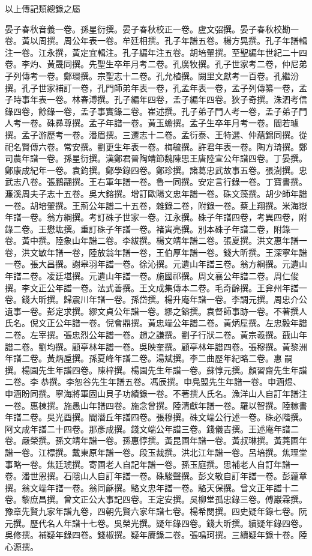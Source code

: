 \begin{pinyinscope}
以上傳記類總錄之屬

晏子春秋音義一卷。孫星衍撰。晏子春秋校正一卷。盧文弨撰。晏子春秋校勘一卷。黃以周撰。周公年表一卷。牟廷相撰。孔子年譜五卷。楊方晃撰。孔子年譜輯注一卷。江永撰，黃定宜輯注。孔子編年注五卷。胡培翬撰。至聖編年世紀二十四卷。李灼、黃晟同撰。先聖生卒年月考二卷。孔廣牧撰。孔子世家考二卷，仲尼弟子列傳考一卷。鄭環撰。宗聖志十二卷。孔允植撰。闕里文獻考一百卷。孔繼汾撰。孔子世家補訂一卷，孔門師弟年表一卷，孔孟年表一卷，孟子列傳纂一卷，孟子時事年表一卷。林春溥撰。孔子編年四卷，孟子編年四卷。狄子奇撰。洙泗考信錄四卷，餘錄一卷，孟子事實錄二卷。崔述撰。孔子弟子門人考一卷，孟子弟子門人考一卷。硃彞尊撰。孟子年譜一卷。黃玉蟾撰。孟子生卒年月考一卷。閻若璩撰。孟子游歷考一卷。潘眉撰。三遷志十二卷。孟衍泰、王特選、仲蘊錦同撰。從祀名賢傳六卷。常安撰。劉更生年表一卷。梅毓撰。許君年表一卷。陶方琦撰。鄭司農年譜一卷。孫星衍撰。漢鄭君晉陶靖節魏陳思王唐陸宣公年譜四卷。丁晏撰。鄭康成紀年一卷。袁鈞撰。鄭學錄四卷。鄭珍撰。諸葛忠武故事五卷。張澍撰。忠武志八卷。張鵬翮撰。王右軍年譜一卷。魯一同撰。安定言行錄一卷。丁寶書撰。濂溪周夫子志十五卷。吳大鎔撰。增訂歐陽文忠年譜一卷。硃文藻撰。胡少師年譜一卷。胡培翬撰。王荊公年譜二十五卷，雜錄二卷，附錄一卷。蔡上翔撰。米海嶽年譜一卷。翁方綱撰。考訂硃子世家一卷。江永撰。硃子年譜四卷，考異四卷，附錄二卷。王懋竑撰。重訂硃子年譜一卷。褚寅亮撰。別本硃子年譜二卷，附錄一卷。黃中撰。陸象山年譜二卷。李紱撰。楊文靖年譜二卷。張夏撰。洪文惠年譜一卷，洪文敏年譜一卷，陸放翁年譜一卷，王伯厚年譜一卷。錢大昕撰。王深寧年譜一卷。張大昌撰。謝皋羽年譜一卷。徐沁撰。元遺山年譜三卷。翁方綱撰。元遺山年譜二卷。凌廷堪撰。元遺山年譜一卷。施國祁撰。周文襄公年譜二卷。周仁俊撰。李文正公年譜一卷。法式善撰。王文成集傳本二卷。毛奇齡撰。王弇州年譜一卷。錢大昕撰。歸震川年譜一卷。孫岱撰。楊升庵年譜一卷。李調元撰。周忠介公遺事一卷。彭定求撰。繆文貞公年譜一卷。繆之鎔撰。袁督師事跡一卷。不著撰人氏名。倪文正公年譜一卷。倪會鼎撰。黃忠端公年譜二卷。黃炳垕撰。左忠毅年譜二卷。左宰撰。張忠烈公年譜一卷。趙之謙撰。劉子行狀二卷。黃宗羲撰。蕺山年譜二卷。劉均撰。顧亭林年譜一卷。吳映奎撰。顧亭林年譜四卷。張穆撰。黃黎洲年譜二卷。黃炳垕撰。孫夏峰年譜二卷。湯斌撰。李二曲歷年紀略二卷。惠嗣撰。楊園先生年譜四卷。陳梓撰。楊園先生年譜一卷。蘇惇元撰。顏習齋先生年譜二卷。李恭撰。李恕谷先生年譜五卷。馮辰撰。申鳧盟先生年譜一卷。申涵煜、申涵盼同撰。寧海將軍固山貝子功績錄一卷。不著撰人氏名。漁洋山人自訂年譜注一卷。惠棟撰。施愚山年譜四卷。施念曾撰。陸清獻年譜一卷。羅以智撰。陸稼書年譜二卷。吳光酉撰。閻潛丘年譜四卷。張穆撰。硃文端公行述一卷。硃必階撰。阿文成年譜二十四卷。那彥成撰。錢文端公年譜三卷。錢儀吉撰。王述庵年譜二卷。嚴榮撰。孫文靖年譜一卷。孫惠惇撰。黃昆圃年譜一卷。黃叔琳撰。黃蕘圃年譜一卷。江標撰。戴東原年譜一卷。段玉裁撰。洪北江年譜一卷。呂培撰。焦理堂事略一卷。焦廷琥撰。寄圃老人自記年譜一卷。孫玉庭撰。思補老人自訂年譜一卷。潘世恩撰。石隱山人自訂年譜一卷。硃駿聲撰。彭文敬自訂年譜一卷。彭蘊章撰。翁文端年譜一卷。翁同龢撰。駱文忠年譜一卷。駱天保撰。曾文正年譜十二卷。黎庶昌撰。曾文正公大事記四卷。王定安撰。吳柳堂孤忠錄三卷。傅巖霖撰。豫章先賢九家年譜九卷，四朝先賢六家年譜七卷。楊希閔撰。四史疑年錄七卷。阮元撰。歷代名人年譜十七卷。吳榮光撰。疑年錄四卷。錢大昕撰。續疑年錄四卷。吳修撰。補疑年錄四卷。錢椒撰。疑年賡錄二卷。張鳴珂撰。三續疑年錄十卷。陸心源撰。


\end{pinyinscope}
